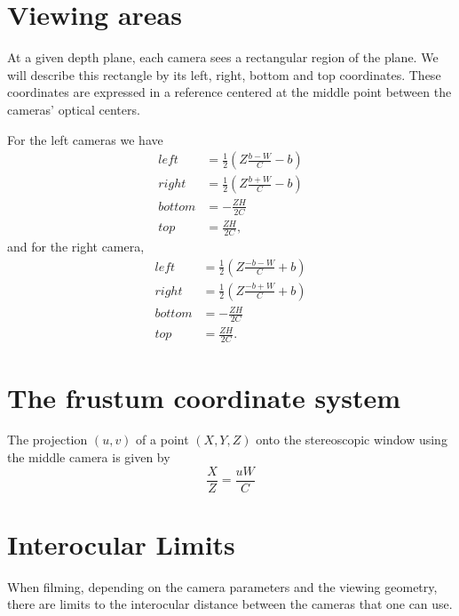 \documentclass[12pt,a4paper]{article}
\begin{document}
\section{Viewing areas}
At a given depth plane, each camera sees a rectangular region of the plane.  We will describe this rectangle by its left, right, bottom and top coordinates. These coordinates are expressed in a reference centered at the middle point between the cameras' optical centers.

For the left cameras we have
\begin{equation}
 \begin{split}
  left &= \frac{1}{2} \left( Z \frac{b - W}{C} - b\right) \\
  right &= \frac{1}{2} \left( Z \frac{b + W}{C} - b\right) \\
  bottom &= -\frac{Z H}{2 C} \\
  top &= \frac{Z H}{2 C} ,
 \end{split}
\end{equation}
and for the right camera,
\begin{equation}
 \begin{split}
  left &= \frac{1}{2} \left( Z \frac{-b - W}{C} + b\right) \\
  right &= \frac{1}{2} \left( Z \frac{-b + W}{C} + b\right) \\
  bottom &= -\frac{Z H}{2 C} \\
  top &= \frac{Z H}{2 C} .
 \end{split}
\end{equation}

\section{The frustum coordinate system}
The projection $(u,v)$ of a point $(X,Y,Z)$ onto the stereoscopic window using the middle camera is given by
\begin{equation}
\frac{X}{Z} = \frac{u W}{C}
\end{equation}


\section{Interocular Limits}
When filming, depending on the camera parameters and the viewing geometry, there are limits to the interocular distance between the cameras that one can use.
\end{document}
